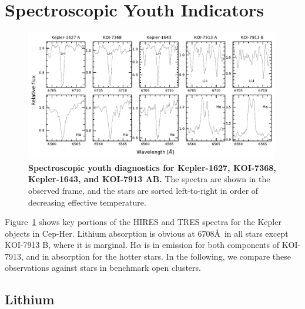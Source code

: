 \documentclass[12pt,twocolumn]{aastex63}
\begin{document}
\section{Spectroscopic Youth Indicators}
\label{app:spectra}

\begin{figure}[tp]
	\begin{center}
		\leavevmode
			\includegraphics[width=0.99\textwidth]{f5.pdf}
	\end{center}
	\vspace{-0.3cm}
	\caption{
    {\bf Spectroscopic youth diagnostics for Kepler-1627, KOI-7368,
    Kepler-1643, and KOI-7913 AB. }
    The spectra are shown in the observed frame, and the stars are
    sorted left-to-right in order of decreasing effective temperature.
    \label{fig:koiyouthindicators}
	}
\end{figure}

Figure~\ref{fig:koiyouthindicators} shows key portions of the HIRES
and TRES spectra for the Kepler objects in Cep-Her.  Lithium
absorption is obvious at 6708\AA\ in all stars except KOI-7913 B,
where it is marginal.  H$\alpha$ is in emission for both components of
KOI-7913, and in absorption for the hotter stars.  In the following,
we compare these observations against stars in benchmark open
clusters.

\subsection{Lithium}
\end{document}
